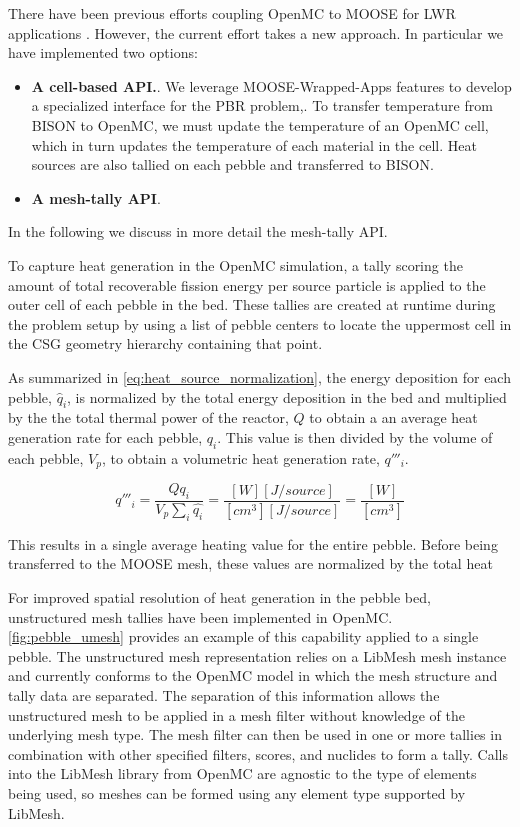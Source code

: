 There have been previous efforts coupling OpenMC to MOOSE for LWR applications \cite{ellis2017preliminary}.
However, the current effort takes a new approach. In particular we have implemented two options:
\begin{itemize}
    \item \textbf{A cell-based API.}.  We leverage MOOSE-Wrapped-Apps features to develop a specialized interface for the PBR problem,. To transfer temperature from BISON to OpenMC, we must update the temperature of an OpenMC cell, which in turn updates the temperature of each material in the cell. Heat sources are also tallied on each pebble and transferred to BISON.
    \item \textbf{A mesh-tally API}.
\end{itemize}

In the following we discuss in more detail the mesh-tally API.

To capture heat generation in the OpenMC simulation, a tally scoring the amount of total recoverable fission energy per source particle is applied to the outer cell of each pebble in the bed. These tallies are created at runtime during the problem setup by using a list of pebble centers to locate the uppermost cell in the CSG geometry hierarchy containing that point.

As summarized in \autoref{eq:heat_source_normalization}, the energy deposition for each pebble, $\hat{q}_{i}$, is normalized by the total energy deposition in the bed and multiplied by the the total thermal power of the reactor, $Q$ to obtain a an average heat generation rate for each pebble, $q_i$. This value is then divided by the volume of each pebble, $V_p$, to obtain a volumetric heat generation rate, $q'''_i$.

\begin{equation}
    \label{eq:heat_source_normalization}
    q'''_i = \frac{Q q_i}{V_{p}\sum_{i}{\hat{q_i}}} = \frac{[W][J/source]}{[cm^{3}] [J/source]} = \frac{[W]}{[cm^{3}]}
\end{equation}

This results in a single average heating value for the entire pebble. Before being transferred to the MOOSE mesh, these values are normalized by the total heat

For improved spatial resolution of heat generation in the pebble bed, unstructured mesh tallies have been implemented in OpenMC. \autoref{fig:pebble_umesh} provides an example of this capability applied to a single pebble. The unstructured mesh representation relies on a LibMesh mesh instance and currently conforms to the OpenMC model in which the mesh structure and tally data are separated. The separation of this information allows the unstructured mesh to be applied in a mesh filter without knowledge of the underlying mesh type. The mesh filter can then be used in one or more tallies in combination with other specified filters, scores, and nuclides to form a tally. Calls into the LibMesh library from OpenMC are agnostic to the type of elements being used, so meshes can be formed using any element type supported by LibMesh.

